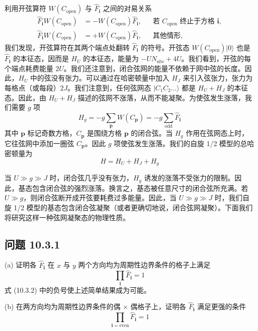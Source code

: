 利用开弦算符 $W(C_{\mathrm{open}})$ 与 $\hat F_{\pmb{i}}$ 之间的对易关系
\begin{align*}
\hat F_{\pmb{i}}W(C_{\mathrm{open}})&=-W(C_{\mathrm{open}})\hat F_{\pmb{i}}, && \text{若 } C_{\mathrm{open}} \text{ 终止于方格 } \pmb{i},\\
\hat F_{\pmb{i}}W(C_{\mathrm{open}})&=+W(C_{\mathrm{open}})\hat F_{\pmb{i}}, && \text{其他情形},
\end{align*}
我们发现，开弦算符在其两个端点处翻转 $\hat F_{\pmb{i}}$ 的符号。开弦态 $W(C_{\mathrm{open}})|0\rangle$ 也是 $\hat F_{\pmb{i}}$ 的本征态，因而是 $H_U$ 的本征态，能量为 $-UN_{\mathrm{site}}+4U$。我们看到，开弦的每个端点耗费能量 $2U$。我们还注意到，闭合弦网的能量不依赖于网中弦的长度。因此，$H_U$ 中的弦没有张力。可以通过在哈密顿量中加入 $H_J$ 来引入弦张力，张力为每格点（或每段）$2J$。我们注意到，任何弦网态 $|C_1C_2\dots\rangle$ 都是 $H_U+H_J$ 的本征态。因此，由 $H_U+H_J$ 描述的弦网不涨落，从而不能凝聚。为使弦发生涨落，我们需要 $g$ 项
\begin{equation*}
H_g=-g\sum_{\pmb{p}}W(C_{\pmb{p}})=-g\sum_{\mathrm{odd}}\hat F_{\pmb{i}}
\end{equation*}
其中 $\pmb{p}$ 标记奇数方格，$C_{\pmb{p}}$ 是围绕方格 $\pmb{p}$ 的闭合弦。当 $H_g$ 作用在弦网态上时，它往弦网中添加一圈弦 $C_{\pmb{p}}$。因此 $g$ 项使弦发生涨落。我们的自旋 1/2 模型的总哈密顿量为
\begin{equation*}
H=H_U+H_J+H_g
\end{equation*}

当 $U\gg g\gg J$ 时，闭合弦几乎没有张力，$H_g$ 诱发的涨落不受张力的限制。因此，基态包含闭合弦的强烈涨落。换言之，基态被任意尺寸的闭合弦所充满。若 $U\gg g$，则闭合弦断开成开弦要耗费过多能量。因此，当 $U\gg g\gg J$ 时，我们自旋 1/2 模型的基态包含闭合弦凝聚（或者更确切地说，闭合弦网凝聚）。下面我们将研究这样一种弦网凝聚态的物理性质。

\subsection*{问题 10.3.1}

(a) 证明各 $\hat F_{\pmb{i}}$ 在 $x$ 与 $y$ 两个方向均为周期性边界条件的格子上满足
\begin{equation*}
\prod_{\pmb{i}}\hat F_{\pmb{i}}=1\tag{10.3.3}
\end{equation*}
式 (10.3.2) 中的负号使上述简单结果成为可能。

(b) 在两方向均为周期性边界条件的偶 $\times$ 偶格子上，证明各 $\hat F_{\pmb{i}}$ 满足更强的条件
\begin{equation*}
\prod_{\pmb{i}=\mathrm{even}}\hat F_{\pmb{i}}=1\tag{10.3.4}
\end{equation*}

